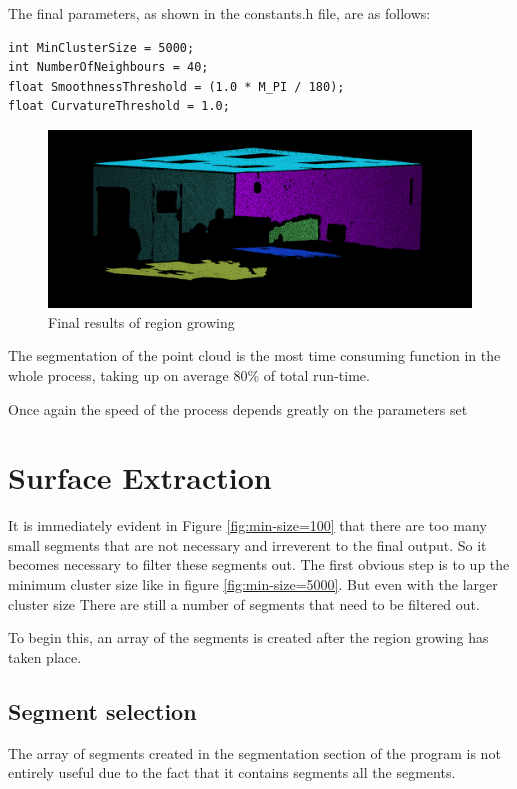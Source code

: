 		The final parameters, as shown in the constants.h file, are as follows:
		\label{RGParams}
		\begin{lstlisting}
int MinClusterSize = 5000;
int NumberOfNeighbours = 40;
float SmoothnessThreshold = (1.0 * M_PI / 180);
float CurvatureThreshold = 1.0;
		\end{lstlisting}
			
			\begin{figure}[H]
				\centering
				\includegraphics[width=1\linewidth]{Includes/images/RegionGrowing/Final}
				\caption{Final results of region growing}
				\label{fig:Final}
			\end{figure}
 
	
			The segmentation of the point cloud is the most time consuming function in the whole process, taking up on average 80\% of total run-time.
			
			Once again the speed of the process depends greatly on the parameters set
		
		

	\section{Surface Extraction}
	
	It is immediately evident in Figure \ref{fig:min-size=100} that there are too many small segments that are not necessary and irreverent to the final output. So it becomes necessary to filter these segments out. The first obvious step is to up the minimum cluster size like in figure \ref{fig:min-size=5000}. But even with the larger cluster size There are still a number of segments that need to be filtered out.
	
	To begin this, an array of the segments is created after the region growing has taken place.


	\subsection{Segment selection}
		The array of segments created in the segmentation section of the program is not entirely useful due to the fact that it contains segments all the segments.
		
